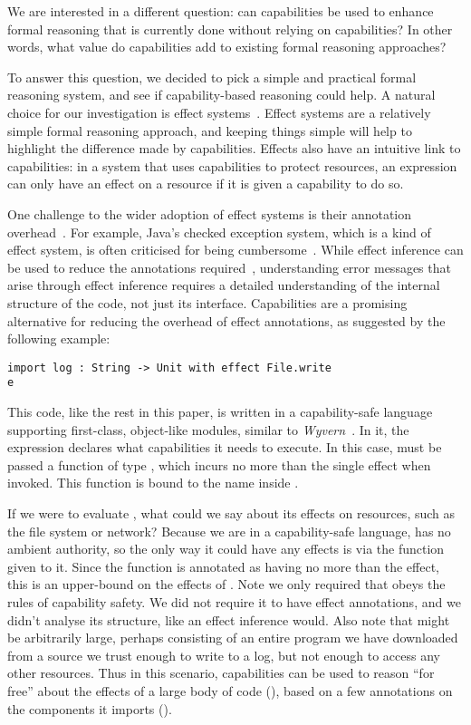 We are interested in a different question: can capabilities be used to
enhance formal reasoning that is currently done without relying on
capabilities?  In other words, what value do capabilities add to
existing formal reasoning approaches?

To answer this question, we
decided to pick a simple and practical formal reasoning system, and 
see if capability-based reasoning could help.  A natural choice for our
investigation is effect systems~\cite{nielson99}.  Effect systems
are a relatively simple formal reasoning approach, and keeping things
simple will help to highlight the difference made by capabilities.
 Effects also have an intuitive link to capabilities: in a system that
 uses capabilities to protect resources, an expression can only have
 an effect on a resource if it is given a capability to do so.

One challenge to the wider adoption of effect systems is their annotation
overhead~\cite{rytz12}. For example, Java's checked exception system, which
is a kind of effect system, is often criticised for being cumbersome~\cite{Kiniry2006}. While effect inference can be used to reduce the annotations required~\cite{koka14},
understanding error messages that arise through effect inference requires a detailed understanding of the internal structure of the code, not just its interface. Capabilities are a promising
alternative for reducing the overhead of effect annotations, as
suggested by the following example:

\begin{lstlisting}
import log : String -> Unit with effect File.write
e
\end{lstlisting}

This code, like the rest in this paper, is written in a capability-safe language supporting
first-class, object-like modules, similar to \textit{Wyvern}~\cite{kurilova16}. In it, the
expression  declares what capabilities it needs to execute. In this case,
 must be passed a function of type , which
incurs no more than the single  effect when invoked. This function is
bound to the name  inside .

If we were to evaluate , what could we say about its effects on resources,
such as the file system or network? Because we are in a capability-safe language,
 has no ambient authority, so the only way it could have any effects is via
the  function given to it. Since the  function is annotated as
having no more than the  effect, this is an upper-bound on the
effects of . Note we only required that  obeys the rules of
capability safety. We did not require it to have effect annotations, and we
didn't analyse its structure, like an effect inference would. Also note that 
might be arbitrarily large, perhaps consisting of an entire program we have
downloaded from a source we trust enough to write to a log, but not enough to
access any other resources. Thus in this scenario, capabilities can be used to
reason ``for free'' about the effects of a large body of code (), based on a
few annotations on the components it imports ().


